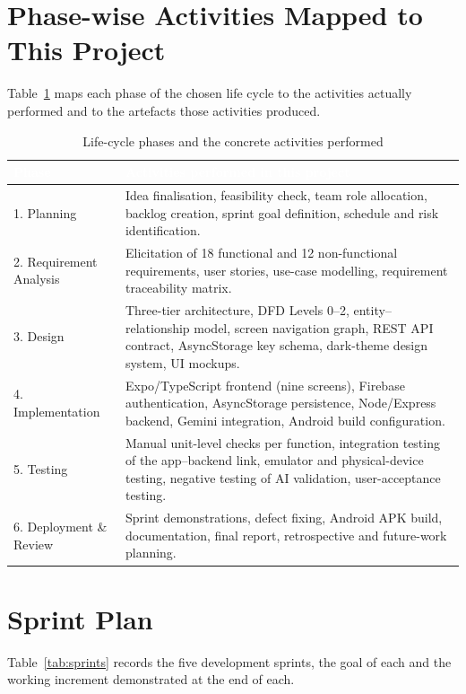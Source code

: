 \documentclass[12pt,a4paper,oneside]{report}
\begin{document}
\section{Phase-wise Activities Mapped to This Project}

Table~\ref{tab:phases} maps each phase of the chosen life cycle to the activities actually performed and to the artefacts those activities produced.

\begin{table}[H]
\centering
\caption{Life-cycle phases and the concrete activities performed}
\label{tab:phases}
\small
\begin{tabularx}{\textwidth}{@{}p{2.9cm}X@{}}
\toprule
\rowcolor{tblhead} \textcolor{white}{\textbf{Phase}} &
\textcolor{white}{\textbf{Activities performed in this project}} \\
\midrule
1. Planning & Idea finalisation, feasibility check, team role allocation, backlog
  creation, sprint goal definition, schedule and risk identification. \\
2. Requirement Analysis & Elicitation of 18 functional and 12 non-functional
  requirements, user stories, use-case modelling, requirement traceability matrix. \\
3. Design & Three-tier architecture, DFD Levels 0--2, entity--relationship model,
  screen navigation graph, REST API contract, AsyncStorage key schema, dark-theme
  design system, UI mockups. \\
4. Implementation & Expo/TypeScript frontend (nine screens), Firebase
  authentication, AsyncStorage persistence, Node/Express backend, Gemini
  integration, Android build configuration. \\
5. Testing & Manual unit-level checks per function, integration testing of the
  app--backend link, emulator and physical-device testing, negative testing of AI
  validation, user-acceptance testing. \\
6. Deployment \& Review & Sprint demonstrations, defect fixing, Android APK build,
  documentation, final report, retrospective and future-work planning. \\
\bottomrule
\end{tabularx}
\end{table}

\section{Sprint Plan}

Table~\ref{tab:sprints} records the five development sprints, the goal of each and the working increment demonstrated at the end of each.
\end{document}
